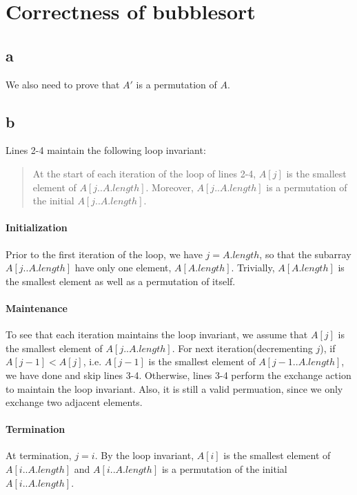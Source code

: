 \section{Correctness of bubblesort}

\subsection{a}

We also need to prove that $A'$ is a permutation of $A$.


\subsection{b}

Lines 2-4 maintain the following loop invariant:

\begin{quote}
At the start of each iteration of the  loop of lines 2-4, $A[j]$ is the smallest element of $A[j..A.length]$.
Moreover, $A[j..A.length]$ is a permutation of the initial $A[j..A.length]$.
\end{quote}

\paragraph{Initialization}
Prior to the first iteration of the loop, we have $j = A.length$, so that the subarray $A[j..A.length]$ have only one element, $A[A.length]$.
Trivially, $A[A.length]$ is the smallest element as well as a permutation of itself.

\paragraph{Maintenance}
To see that each iteration maintains the loop invariant, we assume that $A[j]$ is the smallest element of $A[j..A.length]$.
For next iteration(decrementing $j$), if $A[j - 1] < A[j]$, i.e. $A[j - 1]$ is the smallest element of $A[j - 1..A.length]$, we have done and skip lines 3-4.
Otherwise, lines 3-4 perform the exchange action to maintain the loop invariant.
Also, it is still a valid permuation, since we only exchange two adjacent elements.

\paragraph{Termination}
At termination, $j = i$.
By the loop invariant, $A[i]$ is the smallest element of $A[i..A.length]$ and $A[i..A.length]$ is a permutation of the initial $A[i..A.length]$.


